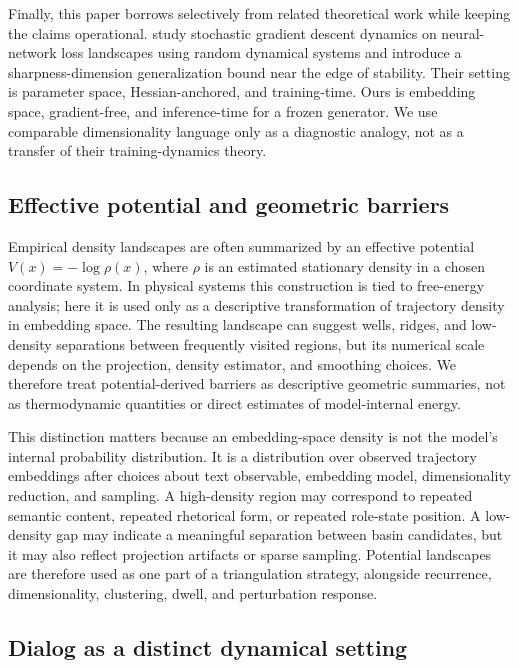 \documentclass{article}
\theoremstyle{plain}
\theoremstyle{definition}
\begin{document}
Finally, this paper borrows selectively from related theoretical work while keeping the claims operational. \citet{arxiv260419740} study stochastic gradient descent dynamics on neural-network loss landscapes using random dynamical systems and introduce a sharpness-dimension generalization bound near the edge of stability. Their setting is parameter space, Hessian-anchored, and training-time. Ours is embedding space, gradient-free, and inference-time for a frozen generator. We use comparable dimensionality language only as a diagnostic analogy, not as a transfer of their training-dynamics theory.

\subsection{Effective potential and geometric barriers}

Empirical density landscapes are often summarized by an effective potential \(V(x)=-\log \rho(x)\), where \(\rho\) is an estimated stationary density in a chosen coordinate system. In physical systems this construction is tied to free-energy analysis; here it is used only as a descriptive transformation of trajectory density in embedding space. The resulting landscape can suggest wells, ridges, and low-density separations between frequently visited regions, but its numerical scale depends on the projection, density estimator, and smoothing choices. We therefore treat potential-derived barriers as descriptive geometric summaries, not as thermodynamic quantities or direct estimates of model-internal energy.

This distinction matters because an embedding-space density is not the model's internal probability distribution. It is a distribution over observed trajectory embeddings after choices about text observable, embedding model, dimensionality reduction, and sampling. A high-density region may correspond to repeated semantic content, repeated rhetorical form, or repeated role-state position. A low-density gap may indicate a meaningful separation between basin candidates, but it may also reflect projection artifacts or sparse sampling. Potential landscapes are therefore used as one part of a triangulation strategy, alongside recurrence, dimensionality, clustering, dwell, and perturbation response.

\subsection{Dialog as a distinct dynamical setting}
\end{document}
